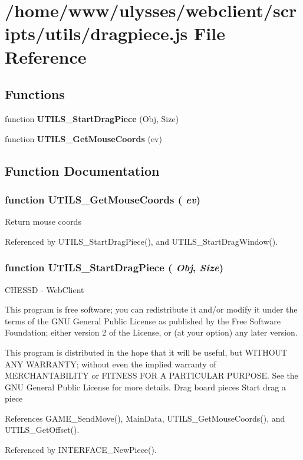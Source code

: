 \section{/home/www/ulysses/webclient/scripts/utils/dragpiece.js File Reference}
\label{dragpiece_8js}
\subsection*{Functions}
\begin{CompactItemize}
\item 
function {\bf UTILS\_\-StartDragPiece} (Obj, Size)
\item 
function {\bf UTILS\_\-GetMouseCoords} (ev)
\end{CompactItemize}


\subsection{Function Documentation}
\subsubsection{\setlength{\rightskip}{0pt plus 5cm}function UTILS\_\-GetMouseCoords ( {\em ev})}\label{dragpiece_8js_d87f2f47e68578008de810783d30ad5f}


Return mouse coords 

Referenced by UTILS\_\-StartDragPiece(), and UTILS\_\-StartDragWindow().
\subsubsection{\setlength{\rightskip}{0pt plus 5cm}function UTILS\_\-StartDragPiece ( {\em Obj}, \/   {\em Size})}\label{dragpiece_8js_531d2dc77bbcf3a0911298d32cd923e1}


CHESSD - WebClient

This program is free software; you can redistribute it and/or modify it under the terms of the GNU General Public License as published by the Free Software Foundation; either version 2 of the License, or (at your option) any later version.

This program is distributed in the hope that it will be useful, but WITHOUT ANY WARRANTY; without even the implied warranty of MERCHANTABILITY or FITNESS FOR A PARTICULAR PURPOSE. See the GNU General Public License for more details. Drag board pieces Start drag a piece 

References GAME\_\-SendMove(), MainData, UTILS\_\-GetMouseCoords(), and UTILS\_\-GetOffset().

Referenced by INTERFACE\_\-NewPiece().